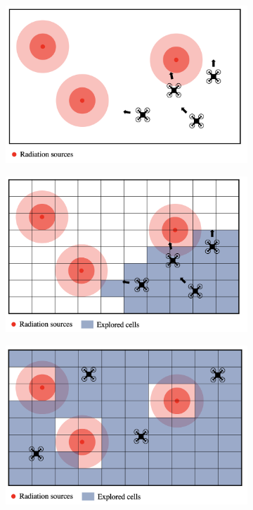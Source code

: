 \begin{figure}[htbp]
    \centering
    \begin{subfigure}{0.45\textwidth}
         \centering
         \includegraphics[width=\textwidth]{figures/dora_explorer/risk_aware_a.png}
         \caption{}
         \label{risk_aware_a}
    \end{subfigure}
    \begin{subfigure}{0.45\textwidth}
         \centering
         \includegraphics[width=\textwidth]{figures/dora_explorer/risk_aware_b.png}
         \caption{}
         \label{risk_aware_b}
    \end{subfigure}
    \begin{subfigure}{0.45\textwidth}
         \centering
         \includegraphics[width=\textwidth]{figures/dora_explorer/risk_aware_c.png}

\end{subfigure}
\end{figure}
